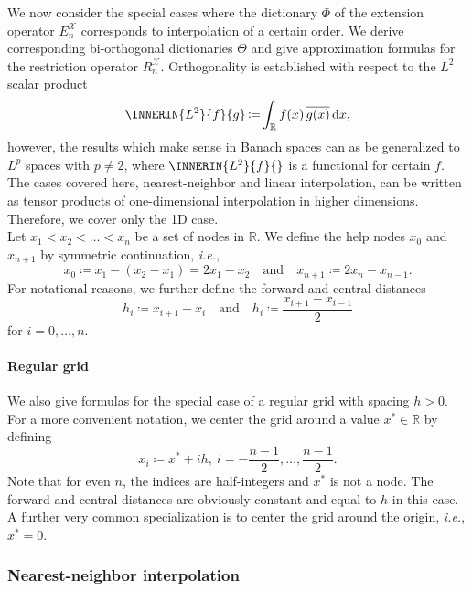 \documentclass[a4paper]{paper}
\newcommand*{\SPC}[1]{{\ensuremath{\mathscr{#1}}}}
\newcommand{\RR}{{\ensuremath{\mathbb{R}}}}
\newcommand*{\EXT}[2]{\ensuremath{E_{#1}^{#2}}}
\newcommand*{\REST}[2]{\ensuremath{R_{#1}^{#2}}}
\newcommand*{\RnX}{{\ensuremath{\REST{n}{\SPC{X}}}}}
\newcommand*{\EnX}{{\ensuremath{\EXT{n}{\SPC{X}}}}}
\DeclareMathOperator{\DEFEQ}{{\coloneqq}}
\newcommand*{\CCONJ}[1]{{\ensuremath{\overline{#1}}}}
\newcommand*{\D}{{\ensuremath{\mathrm{d}}}}
\newcommand*{\ie}{\textsl{i.e.}\xspace}
\begin{document}
We now consider the special cases where the dictionary $\Phi$ of the extension operator $\EnX$ corresponds to 
interpolation of a certain order. We derive corresponding bi-orthogonal dictionaries $\Theta$ and give approximation 
formulas for the restriction operator $\RnX$. Orthogonality is established with respect to the $L^2$ scalar product
%
\begin{equation*}
 \INNERIN{L^2}{f}{g} \DEFEQ \int_\RR f(x)\, \CCONJ{g(x)}\, \D x,
\end{equation*}
%
however, the results which make sense in Banach spaces can as be generalized to $L^p$ spaces with $p \neq 2$, where 
$\INNERIN{L^2}{f}{}$ is a functional for certain $f$. The cases covered here, nearest-neighbor and linear 
interpolation, 
can be written as tensor products of one-dimensional interpolation in higher dimensions. Therefore, we cover only the 
1D 
case. \\
%
Let $x_1 < x_2 < \dots < x_n$ be a set of nodes in $\RR$. We define the help nodes $x_0$ 
and $x_{n+1}$ by symmetric continuation, \ie,
%
\begin{equation*}
 x_0 \DEFEQ x_1 - (x_2 - x_1) = 2 x_1 - x_2
 \quad \text{and} \quad
 x_{n+1} \DEFEQ  2 x_n - x_{n-1}.
\end{equation*}
%
For notational reasons, we further define the forward and central distances
%
\begin{equation*}
 h_i \DEFEQ x_{i+1} - x_i
 \quad\text{and}\quad
 \bar h_i \DEFEQ \frac{x_{i+1} - x_{i-1}}{2}
\end{equation*}
%
for $i=0,\dots,n$.

\paragraph{Regular grid}

We also give formulas for the special case of a regular grid with spacing $h>0$. For a more convenient notation, we 
center the grid around a value $x^*\in\RR$ by defining
%
\begin{equation*}
 x_i \DEFEQ x^* + ih,\ i = -\frac{n-1}{2}, \dots, \frac{n-1}{2}.
\end{equation*}
%
Note that for even $n$, the indices are half-integers and $x^*$ is not a node. The forward and central distances are 
obviously constant and equal to $h$ in this case. A further very common specialization is to center the grid around the 
origin, \ie, $x^*=0$.



\subsubsection{Nearest-neighbor interpolation}
\label{subsubsec:specif:interp:nn}
\end{document}
